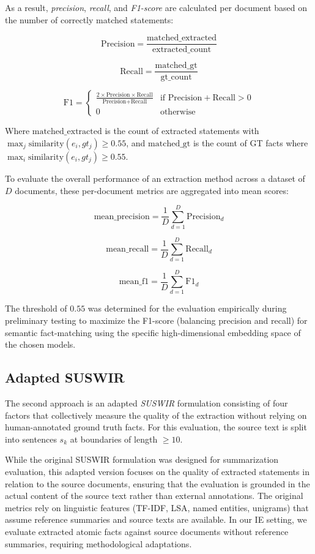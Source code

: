 As a result, \textit{precision}, \textit{recall}, and \textit{F1-score} are calculated per document based on the number of correctly matched statements:

\[
\text{Precision} = \frac{\text{matched\_extracted}}{\text{extracted\_count}}
\]

\[
\text{Recall} = \frac{\text{matched\_gt}}{\text{gt\_count}}
\]

\[
\text{F1} = \begin{cases}
\frac{2 \times \text{Precision} \times \text{Recall}}{\text{Precision} + \text{Recall}} & \text{if } \text{Precision} + \text{Recall} > 0 \\
0 & \text{otherwise}
\end{cases}
\]

Where $\text{matched\_extracted}$ is the count of extracted statements with $\max_j \text{similarity}(e_i, gt_j) \geq 0.55$, and $\text{matched\_gt}$ is the count of GT facts where $\max_i \text{similarity}(e_i, gt_j) \geq 0.55$. 

To evaluate the overall performance of an extraction method across a dataset of $D$ documents, these per-document metrics are aggregated into mean scores:

\[
\text{mean\_precision} = \frac{1}{D} \sum_{d=1}^{D} \text{Precision}_d
\]

\[
\text{mean\_recall} = \frac{1}{D} \sum_{d=1}^{D} \text{Recall}_d
\]

\[
\text{mean\_f1} = \frac{1}{D} \sum_{d=1}^{D} \text{F1}_d
\]

The threshold of $0.55$ was determined for the evaluation empirically during preliminary testing to maximize the F1-score (balancing precision and recall) for semantic fact-matching using the specific high-dimensional embedding space of the chosen models.

\subsection{Adapted SUSWIR}

The second approach is an adapted \textit{SUSWIR} formulation consisting of four factors that collectively measure the quality of the extraction without relying on human-annotated ground truth facts. 
For this evaluation, the source text is split into sentences $s_k$ at boundaries of length $\geq 10$.

While the original SUSWIR formulation was designed for summarization evaluation, this adapted version focuses on the quality of extracted statements in relation to the source documents, ensuring that the evaluation is grounded in the actual content of the source text rather than external annotations.
The original metrics rely on linguistic features (TF-IDF, LSA, named entities, unigrams) that assume reference summaries and source texts are available. 
In our IE setting, we evaluate extracted atomic facts against source documents without reference summaries, requiring methodological adaptations.

